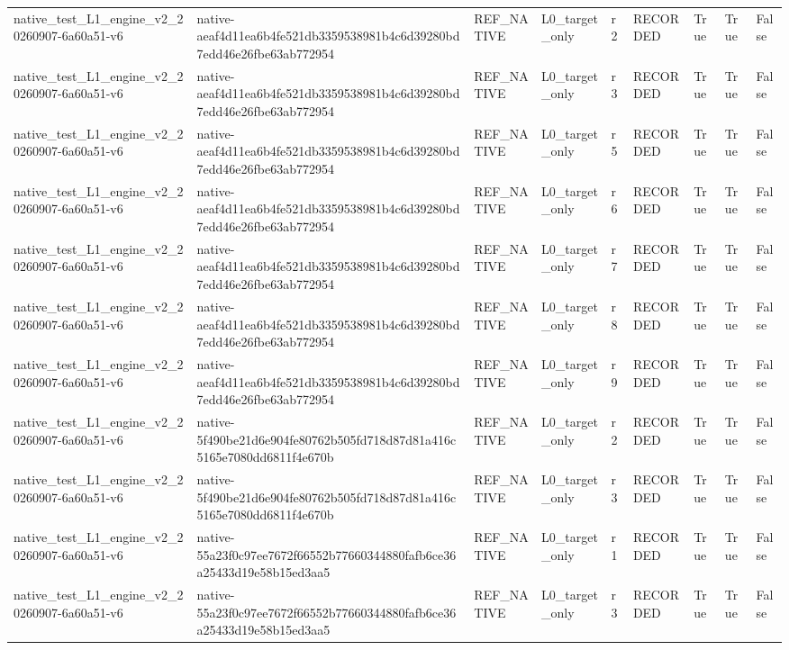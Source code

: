 \begin{tabular}{lllllllll}
native\_test\_L1\_engine\_v2\_20260907-6a60a51-v6 & native-aeaf4d11ea6b4fe521db3359538981b4c6d39280bd7edd46e26fbe63ab772954 & REF\_NATIVE & L0\_target\_only & r2 & RECORDED & True & True & False \\
native\_test\_L1\_engine\_v2\_20260907-6a60a51-v6 & native-aeaf4d11ea6b4fe521db3359538981b4c6d39280bd7edd46e26fbe63ab772954 & REF\_NATIVE & L0\_target\_only & r3 & RECORDED & True & True & False \\
native\_test\_L1\_engine\_v2\_20260907-6a60a51-v6 & native-aeaf4d11ea6b4fe521db3359538981b4c6d39280bd7edd46e26fbe63ab772954 & REF\_NATIVE & L0\_target\_only & r5 & RECORDED & True & True & False \\
native\_test\_L1\_engine\_v2\_20260907-6a60a51-v6 & native-aeaf4d11ea6b4fe521db3359538981b4c6d39280bd7edd46e26fbe63ab772954 & REF\_NATIVE & L0\_target\_only & r6 & RECORDED & True & True & False \\
native\_test\_L1\_engine\_v2\_20260907-6a60a51-v6 & native-aeaf4d11ea6b4fe521db3359538981b4c6d39280bd7edd46e26fbe63ab772954 & REF\_NATIVE & L0\_target\_only & r7 & RECORDED & True & True & False \\
native\_test\_L1\_engine\_v2\_20260907-6a60a51-v6 & native-aeaf4d11ea6b4fe521db3359538981b4c6d39280bd7edd46e26fbe63ab772954 & REF\_NATIVE & L0\_target\_only & r8 & RECORDED & True & True & False \\
native\_test\_L1\_engine\_v2\_20260907-6a60a51-v6 & native-aeaf4d11ea6b4fe521db3359538981b4c6d39280bd7edd46e26fbe63ab772954 & REF\_NATIVE & L0\_target\_only & r9 & RECORDED & True & True & False \\
native\_test\_L1\_engine\_v2\_20260907-6a60a51-v6 & native-5f490be21d6e904fe80762b505fd718d87d81a416c5165e7080dd6811f4e670b & REF\_NATIVE & L0\_target\_only & r2 & RECORDED & True & True & False \\
native\_test\_L1\_engine\_v2\_20260907-6a60a51-v6 & native-5f490be21d6e904fe80762b505fd718d87d81a416c5165e7080dd6811f4e670b & REF\_NATIVE & L0\_target\_only & r3 & RECORDED & True & True & False \\
native\_test\_L1\_engine\_v2\_20260907-6a60a51-v6 & native-55a23f0c97ee7672f66552b77660344880fafb6ce36a25433d19e58b15ed3aa5 & REF\_NATIVE & L0\_target\_only & r1 & RECORDED & True & True & False \\
native\_test\_L1\_engine\_v2\_20260907-6a60a51-v6 & native-55a23f0c97ee7672f66552b77660344880fafb6ce36a25433d19e58b15ed3aa5 & REF\_NATIVE & L0\_target\_only & r3 & RECORDED & True & True & False \\

\end{tabular}
